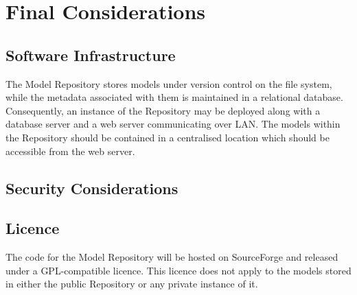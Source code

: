 \section{Final Considerations} 

\subsection{Software Infrastructure}
\label{softwareInfrastructure}
The \ddmore Model Repository stores models under version control on the file system, while the metadata associated with them is maintained in a relational database. Consequently, an instance of the Repository may be deployed along with a database server and a web server communicating over LAN. The models within the Repository should be contained in a centralised location which should be accessible from the web server.

\subsection{Security Considerations}
\label{securityConsiderations}

\subsection{Licence}
\label{licence}
The code for the \ddmore Model Repository will be hosted on SourceForge and released under a GPL-compatible licence. This licence does not apply to the models stored in either the public Repository or any private instance of it. 

